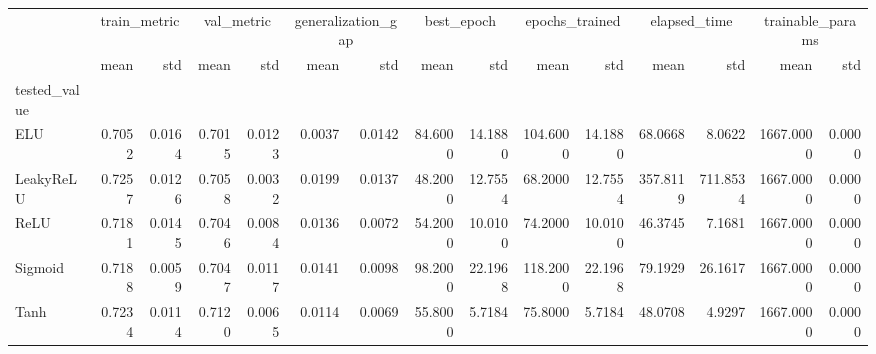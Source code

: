 \begin{tabular}{lrrrrrrrrrrrrrr}
\toprule
 & \multicolumn{2}{c}{train_metric} & \multicolumn{2}{c}{val_metric} & \multicolumn{2}{c}{generalization_gap} & \multicolumn{2}{c}{best_epoch} & \multicolumn{2}{c}{epochs_trained} & \multicolumn{2}{c}{elapsed_time} & \multicolumn{2}{c}{trainable_params} \\
 & mean & std & mean & std & mean & std & mean & std & mean & std & mean & std & mean & std \\
tested_value &  &  &  &  &  &  &  &  &  &  &  &  &  &  \\
\midrule
ELU & 0.7052 & 0.0164 & 0.7015 & 0.0123 & 0.0037 & 0.0142 & 84.6000 & 14.1880 & 104.6000 & 14.1880 & 68.0668 & 8.0622 & 1667.0000 & 0.0000 \\
LeakyReLU & 0.7257 & 0.0126 & 0.7058 & 0.0032 & 0.0199 & 0.0137 & 48.2000 & 12.7554 & 68.2000 & 12.7554 & 357.8119 & 711.8534 & 1667.0000 & 0.0000 \\
ReLU & 0.7181 & 0.0145 & 0.7046 & 0.0084 & 0.0136 & 0.0072 & 54.2000 & 10.0100 & 74.2000 & 10.0100 & 46.3745 & 7.1681 & 1667.0000 & 0.0000 \\
Sigmoid & 0.7188 & 0.0059 & 0.7047 & 0.0117 & 0.0141 & 0.0098 & 98.2000 & 22.1968 & 118.2000 & 22.1968 & 79.1929 & 26.1617 & 1667.0000 & 0.0000 \\
Tanh & 0.7234 & 0.0114 & 0.7120 & 0.0065 & 0.0114 & 0.0069 & 55.8000 & 5.7184 & 75.8000 & 5.7184 & 48.0708 & 4.9297 & 1667.0000 & 0.0000 \\
\bottomrule
\end{tabular}
